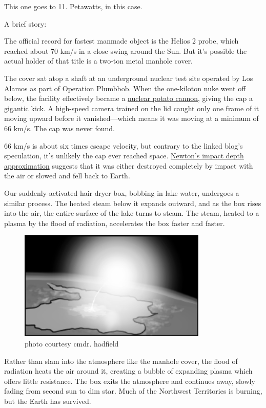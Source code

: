 {This one goes to 11. Petawatts, in this case.}

{A brief story:}

{The official record for fastest manmade object is the Helios 2 probe, which reached about 70 km/s in a close swing around the Sun. But it’s possible the actual holder of that title is a two-ton metal manhole cover.}

{The cover sat atop a shaft at an underground nuclear test site operated by Los Alamos as part of Operation Plumbbob. When the one-kiloton nuke went off below, the facility effectively became a \href{http://nfttu.blogspot.com/2006/01/nuclear-potato-cannon-part-2.html}{nuclear potato cannon}, giving the cap a gigantic kick. A high-speed camera trained on the lid caught only one frame of it moving upward before it vanished—which means it was moving at a minimum of 66 km/s. The cap was never found.}

{66 km/s is about six times escape velocity, but contrary to the linked blog’s speculation, it’s unlikely the cap ever reached space. \href{http://en.wikipedia.org/wiki/Impact\_depth}{Newton’s impact depth approximation} suggests that it was either destroyed completely by impact with the air or slowed and fell back to Earth.}

{Our suddenly-activated hair dryer box, bobbing in lake water, undergoes a similar process. The heated steam below it expands outward, and as the box rises into the air, the entire surface of the lake turns to steam. The steam, heated to a plasma by the flood of radiation, accelerates the box faster and faster.}

\begin{figure}[!htbp]
\centering
\includegraphics[scale=0.5, max width=0.8\textwidth]{imgs/a/35/hair_dryer_launch.png}
\caption{photo courtesy cmdr. hadfield}
\end{figure}

{Rather than slam into the atmosphere like the manhole cover, the flood of radiation heats the air around it, creating a bubble of expanding plasma which offers little resistance. The box exits the atmosphere and continues away, slowly fading from second sun to dim star. Much of the Northwest Territories is burning, but the Earth has survived.}

